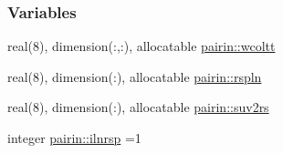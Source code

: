 \subsubsection*{Variables}
\begin{DoxyCompactItemize}
\item 
real(8), dimension(\+:,\+:), allocatable \hyperlink{namespacepairin_a91f1c5ea0d945e465f4a156dd5b59a06}{pairin\+::wcoltt}
\item 
real(8), dimension(\+:), allocatable \hyperlink{namespacepairin_acd8755c2a404fb12ebb6f7701675f293}{pairin\+::rspln}
\item 
real(8), dimension(\+:), allocatable \hyperlink{namespacepairin_a60a518945a929b696384f16087a9309b}{pairin\+::suv2rs}
\item 
integer \hyperlink{namespacepairin_aad65b9e00f967e394d6c6abb1d8aeeea}{pairin\+::ilnrsp} =1
\end{DoxyCompactItemize}
